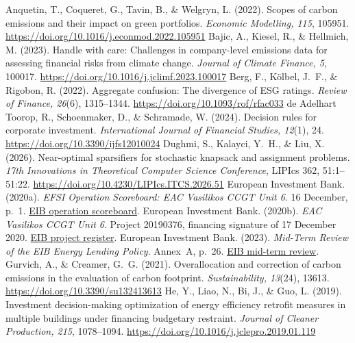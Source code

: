 \begin{thebibliography}{}
\setlength{\itemsep}{5pt plus 1pt}
 Anquetin, T., Coqueret, G., Tavin, B., \& Welgryn, L. (2022). Scopes of carbon emissions and their impact on green portfolios. \emph{Economic Modelling, 115}, 105951. \url{https://doi.org/10.1016/j.econmod.2022.105951}
 Bajic, A., Kiesel, R., \& Hellmich, M. (2023). Handle with care: Challenges in company-level emissions data for assessing financial risks from climate change. \emph{Journal of Climate Finance, 5}, 100017. \url{https://doi.org/10.1016/j.jclimf.2023.100017}
 Berg, F., Kölbel, J.~F., \& Rigobon, R. (2022). Aggregate confusion: The divergence of ESG ratings. \emph{Review of Finance, 26}(6), 1315--1344. \url{https://doi.org/10.1093/rof/rfac033}
 de Adelhart Toorop, R., Schoenmaker, D., \& Schramade, W. (2024). Decision rules for corporate investment. \emph{International Journal of Financial Studies, 12}(1), 24. \url{https://doi.org/10.3390/ijfs12010024}
 Dughmi, S., Kalayci, Y.~H., \& Liu, X. (2026). Near-optimal sparsifiers for stochastic knapsack and assignment problems. \emph{17th Innovations in Theoretical Computer Science Conference}, LIPIcs 362, 51:1--51:22. \url{https://doi.org/10.4230/LIPIcs.ITCS.2026.51}
 European Investment Bank. (2020a). \emph{EFSI Operation Scoreboard: EAC Vasilikos CCGT Unit 6}. 16 December, p.~1. \href{https://www.eib.org/attachments/registers/137305639.pdf}{EIB operation scoreboard}.
 European Investment Bank. (2020b). \emph{EAC Vasilikos CCGT Unit 6}. Project 20190376, financing signature of 17 December 2020. \href{https://www.eib.org/en/projects/all/20190376}{EIB project register}.
 European Investment Bank. (2023). \emph{Mid-Term Review of the EIB Energy Lending Policy}. Annex~A, p.~26. \href{https://www.eib.org/attachments/lucalli/20230012_mid-term_review_of_the_energy_lending_policy_en.pdf}{EIB mid-term review}.
 Gurvich, A., \& Creamer, G.~G. (2021). Overallocation and correction of carbon emissions in the evaluation of carbon footprint. \emph{Sustainability, 13}(24), 13613. \url{https://doi.org/10.3390/su132413613}
 He, Y., Liao, N., Bi, J., \& Guo, L. (2019). Investment decision-making optimization of energy efficiency retrofit measures in multiple buildings under financing budgetary restraint. \emph{Journal of Cleaner Production, 215}, 1078--1094. \url{https://doi.org/10.1016/j.jclepro.2019.01.119}

\end{thebibliography}
